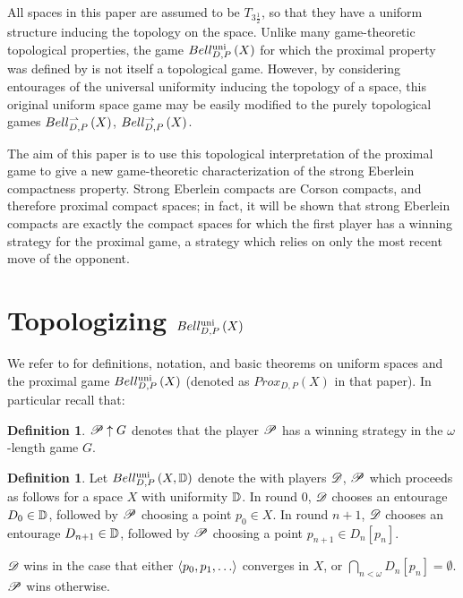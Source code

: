 \documentclass{amsart}
\theoremstyle{definition}
\newtheorem{definition}[theorem]{Definition}
\begin{document}
  All spaces in this paper are assumed to be \(T_{3\frac{1}{2}}\), so that they
  have a uniform structure inducing the topology on the space.
  Unlike many game-theoretic topological properties, the game \(Bell_{D,P}^{\textrm{uni}}\left({X}\right)\)
  for which the proximal property was defined by is not itself a topological
  game. However, by considering entourages of the universal uniformity
  inducing the topology of a space, this original uniform space game may be
  easily modified to the purely topological games
  \(Bell_{D,P}^{\rightharpoonup}\left({X}\right)\), \(Bell_{D,P}^{\to}\left({X}\right)\).

  The aim of this paper is to use this topological interpretation of the
  proximal game to give a new game-theoretic characterization of the
  strong Eberlein compactness property. Strong Eberlein compacts are Corson
  compacts, and therefore proximal compact spaces; in fact, it will be shown
  that strong Eberlein compacts are exactly the compact spaces for which the
  first player has a  winning strategy for the proximal game,
  a strategy which relies on only the most recent move of the opponent.


\section{Topologizing \(Bell_{D,P}^{\textrm{uni}}\left({X}\right)\)}

  We refer to \cite{MR3227201} for definitions, notation, and basic theorems on
  uniform spaces and the proximal game \(Bell_{D,P}^{\textrm{uni}}\left({X}\right)\) (denoted as
  \(Prox_{D,P}(X)\) in that paper). In particular recall that:

  \begin{definition}
    \(\mathscr{P} \uparrow G\) denotes that the player \(\mathscr{P}\) has a winning strategy
    in the \(\omega\)-length game \(G\).
  \end{definition}

  \begin{definition}
    Let \(Bell_{D,P}^{\textrm{uni}}\left({X,\mathbb{D}}\right)\) denote the
     with
    players \(\mathscr{D}\), \(\mathscr{P}\) which proceeds as follows for
    a space \(X\) with uniformity \(\mathbb{D}\). In round \(0\),
    \(\mathscr{D}\) chooses an entourage \(D_0\in\mathbb{D}\), followed by \(\mathscr{P}\)
    choosing a point \(p_0\in X\). In round \(n+1\),
    \(\mathscr{D}\) chooses an entourage
    \(D_{n+1}\in\mathbb{D}\),
    followed by \(\mathscr{P}\) choosing a point \(p_{n+1}\in D_n[p_n]\).

    \(\mathscr{D}\) wins in the case that either
    \(\<p_0,p_1,\dots\>\) converges in \(X\),
    or \(\bigcap_{n<\omega}D_n[p_n] = \emptyset\). \(\mathscr{P}\) wins otherwise.
  \end{definition}
\end{document}
